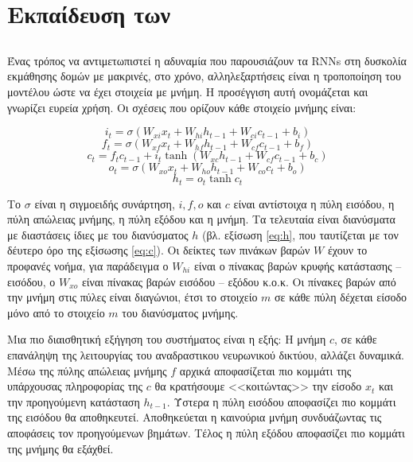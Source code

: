 \section{Εκπαίδευση των }
\subsection{\cite{Hochreiter1997}}

Ένας τρόπος να αντιμετωπιστεί η αδυναμία που παρουσιάζουν τα RNNs στη δυσκολία εκμάθησης δομών με μακρινές, στο χρόνο, αλληλεξαρτήσεις είναι η τροποποίηση του μοντέλου ώστε να έχει στοιχεία με μνήμη.
Η προσέγγιση αυτή ονομάζεται  και γνωρίζει ευρεία χρήση. Οι σχέσεις που ορίζουν κάθε στοιχείο μνήμης είναι:

\begin{equation}
i_t = \sigma{(W_{xi}x_t + W_{hi}h_{t-1} + W_{ci}c_{t-1} + b_i)}
\end{equation}
\begin{equation}
f_t = \sigma{(W_{xf}x_t + W_{hf}h_{t-1} + W_{cf}c_{t-1} + b_f)}
\end{equation}
\begin{equation}
c_t = f_t c_{t-1} + i_t \tanh{(W_{xc} h_{t-1} + W_{cf} c_{t-1} + b_c)}\label{eq:c}
\end{equation}
\begin{equation}
o_t = \sigma(W_{xo}x_t + W_{ho} h_{t-1} + W_{co} c_t + b_o)
\end{equation}
\begin{equation}
h_t = o_t\tanh{c_t}
\end{equation}

Το $\sigma$ είναι η σιγμοειδής συνάρτηση, $i, f, o$ και $c$ είναι αντίστοιχα η πύλη εισόδου, η πύλη απώλειας μνήμης, η πύλη εξόδου και η μνήμη.
Τα τελευταία είναι διανύσματα με διαστάσεις ίδιες με του διανύσματος $h$ (βλ. εξίσωση \ref{eq:h}, που ταυτίζεται με τον δέυτερο όρο της εξίσωσης \ref{eq:c}).
Οι δείκτες των πινάκων βαρών $W$ έχουν το προφανές νοήμα, για παράδειγμα ο $W_{hi}$ είναι ο πίνακας βαρών  κρυφής κατάστασης -- εισόδου, ο $W_{xo}$ είναι πίνακας βαρών εισόδου -- εξόδου κ.ο.κ. Οι πίνακες βαρών από την μνήμη στις πύλες είναι διαγώνιοι, έτσι το στοιχείο $m$ σε κάθε πύλη δέχεται είσοδο μόνο από το στοιχείο $m$ του διανύσματος μνήμης.

Μια πιο διαισθητική εξήγηση του συστήματος  είναι η εξής:
Η μνήμη $c$, σε κάθε επανάληψη της λειτουργίας του αναδραστικου νευρωνικού δικτύου, αλλάζει δυναμικά.
Μέσω της πύλης απώλειας μνήμης $f$ αρχικά αποφασίζεται πιο κομμάτι της υπάρχουσας πληροφορίας της $c$ θα κρατήσουμε <<κοιτώντας>> την είσοδο $x_t$ και την προηγούμενη κατάσταση $h_{t-1}$. Ύστερα η πύλη εισόδου αποφασίζει πιο κομμάτι της εισόδου θα αποθηκευτεί.
Αποθηκεύεται η καινούρια μνήμη συνδυάζωντας τις αποφάσεις τον προηγούμενων βημάτων. Τέλος η πύλη εξόδου αποφασίζει πιο κομμάτι της μνήμης θα εξάχθεί.

